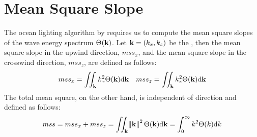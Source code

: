 \section{Mean Square Slope}
\label{app:mss}
%
The ocean lighting algorithm by \cite{misc:oceanlightingfft} requires us to compute
the mean square slopes of the wave energy spectrum $\Theta(\mathbf{k})$.
Let $\mathbf{k} = (k_x, k_z)$ be the \wavevector,
then the mean square slope in the upwind direction, $mss_x$, and the mean square
slope in the crosswind direction, $mss_z$, are defined as follows:
\begin{align}
mss_x = \iint_{\mathbf{k}} k_x^2 \Theta(\mathbf{k}) \mathrm{d}\mathbf{k} &&
mss_z = \iint_{\mathbf{k}} k_z^2 \Theta(\mathbf{k}) \mathrm{d}\mathbf{k}
\end{align}
%
The total mean square, on the other hand, is independent of direction
and defined as follows:
\begin{equation}
mss = mss_x + mss_z = \iint_{\mathbf{k}} \norm{\mathbf{k}}^2 \Theta(\mathbf{k}) \mathrm{d}\mathbf{k} = \int_{0}^{\infty}k^2 \Theta(k)\mathrm{d}k
\end{equation}